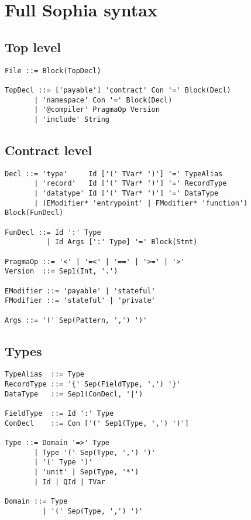 \chapter{Full Sophia syntax}
\label{full_sophia_syntax}

\section{Top level}
\begin{lstlisting}[language=bnf]
File ::= Block(TopDecl)

TopDecl ::= ['payable'] 'contract' Con '=' Block(Decl)
       | 'namespace' Con '=' Block(Decl)
       | '@compiler' PragmaOp Version
       | 'include' String

\end{lstlisting}

\section{Contract level}

\begin{lstlisting}[language=bnf]
Decl ::= 'type'     Id ['(' TVar* ')'] '=' TypeAlias
       | 'record'   Id ['(' TVar* ')'] '=' RecordType
       | 'datatype' Id ['(' TVar* ')'] '=' DataType
       | (EModifier* 'entrypoint' | FModifier* 'function') Block(FunDecl)

FunDecl ::= Id ':' Type
          | Id Args [':' Type] '=' Block(Stmt)

PragmaOp ::= '<' | '=<' | '==' | '>=' | '>'
Version  ::= Sep1(Int, '.')

EModifier ::= 'payable' | 'stateful'
FModifier ::= 'stateful' | 'private'

Args ::= '(' Sep(Pattern, ',') ')'

\end{lstlisting}

\section{Types}

\begin{lstlisting}[language=bnf]
TypeAlias  ::= Type
RecordType ::= '{' Sep(FieldType, ',') '}'
DataType   ::= Sep1(ConDecl, '|')

FieldType  ::= Id ':' Type
ConDecl    ::= Con ['(' Sep1(Type, ',') ')']

Type ::= Domain '=>' Type
       | Type '(' Sep(Type, ',') ')'
       | '(' Type ')'
       | 'unit' | Sep(Type, '*')
       | Id | QId | TVar

Domain ::= Type
         | '(' Sep(Type, ',') ')'

\end{lstlisting}

